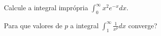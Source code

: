 \begin{exercises}
\begin{exercise}
Calcule a integral imprópria \(\int_0^{\infty} x^2e^{-x}dx\).
\end{exercise}

\begin{exercise}
Para que valores de $p$ a integral \(\int_1^{\infty} \frac{1}{x^p}dx\)
converge?
\end{exercise}



\end{exercises}
